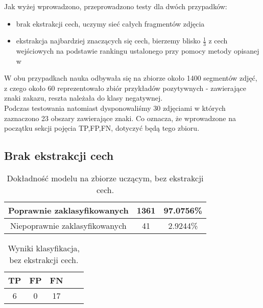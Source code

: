 \documentclass{classrep}
\begin{document}
Jak wyżej wprowadzono, przeprowadzono testy dla dwóch przypadków:
\begin{itemize}
\item brak ekstrakcji cech, uczymy sieć całych fragmentów zdjęcia\\
\item ekstrakcja najbardziej znaczących się cech, bierzemy blisko $\frac{1}{3}$ z cech wejściowych na podstawie rankingu ustalonego przy pomocy metody opisanej w \cite{GuyonEtAl02}\\
\end{itemize}


W obu przypadkach nauka odbywała się na zbiorze około 1400 segmentów zdjęć, z czego około 60 reprezentowało zbiór przykładów pozytywnych - zawierające znaki zakazu, reszta należała do klasy negatywnej.\\

Podczas testowania natomiast dysponowaliśmy 30 zdjęciami w których zaznaczono 23 obszary zawierające znaki. Co oznacza, że wprowadzone na początku sekcji pojęcia TP,FP,FN, dotyczyć będą tego zbioru.\\



\subsection{Brak ekstrakcji cech}


\begin{table}[H]
\centering
\begin{tabular}{|c|c|c|}
\hline 
Poprawnie zaklasyfikowanych &  1361 & 97.0756\% \\ 
\hline 
Niepoprawnie zaklasyfikowanych & 41 & 2.9244\% \\
\hline 
\end{tabular} 
\caption{Dokładność modelu na zbiorze uczącym, bez ekstrakcji cech.}
\label{wyniki:eksproc}
\end{table}



\begin{table}[H]
\centering
\begin{tabular}{|c|c|c|c|c|}
\hline 
TP &  FP &  FN\\
\hline
6  &   0 &  17\\
\hline
\end{tabular} 

\caption{Wyniki klasyfikacja, bez ekstrakcji cech.}
\label{wyniki:eks}
\end{table}
\end{document}
